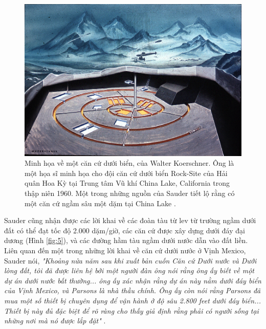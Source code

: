 \documentclass[10pt,twocolumn,letterpaper]{article}
\begin{document}
\begin{figure}[t]
\begin{center}
   \includegraphics[width=1\linewidth]{undersea.jpg}
\end{center}
   \caption{Minh họa về một căn cứ dưới biển, của Walter Koerschner. Ông là một họa sĩ minh họa cho đội căn cứ dưới biển Rock-Site của Hải quân Hoa Kỳ tại Trung tâm Vũ khí China Lake, California trong thập niên 1960. Một trong những nguồn của Sauder tiết lộ rằng có một căn cứ ngầm sâu một dặm tại China Lake \cite{22,23}.}
\label{fig:5}
\label{fig:onecol}
\end{figure}

Sauder cũng nhận được các lời khai về các đoàn tàu từ lev từ trường ngầm dưới đất có thể đạt tốc độ 2.000 dặm/giờ, các căn cứ được xây dựng dưới đáy đại dương (Hình \ref{fig:5}), và các đường hầm tàu ngầm dưới nước dẫn vào đất liền. Liên quan đến một trong những lời khai về căn cứ dưới nước ở Vịnh Mexico, Sauder nói, \textit{"Khoảng nửa năm sau khi xuất bản cuốn Căn cứ Dưới nước và Dưới lòng đất, tôi đã được liên hệ bởi một người đàn ông nói rằng ông ấy biết về một dự án dưới nước bất thường... ông ấy xác nhận rằng dự án này nằm dưới đáy biển của Vịnh Mexico, và Parsons là nhà thầu chính. Ông ấy còn nói rằng Parsons đã mua một số thiết bị chuyên dụng để vận hành ở độ sâu 2.800 feet dưới đáy biển... Thiết bị này đủ đặc biệt để rõ ràng cho thấy giả định rằng phải có người sống tại những nơi mà nó được lắp đặt"} \cite{22}.
\end{document}
